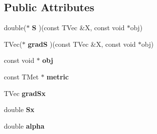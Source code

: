 \subsection*{Public Attributes}
\begin{DoxyCompactItemize}
\item 
\hypertarget{struct_d_r_d_s_p_1_1_line_search_aeeb734f0f9cfb12bb1012900d86b6ad3}{double($\ast$ {\bfseries S} )(const T\-Vec \&X, const void $\ast$obj)}\label{struct_d_r_d_s_p_1_1_line_search_aeeb734f0f9cfb12bb1012900d86b6ad3}

\item 
\hypertarget{struct_d_r_d_s_p_1_1_line_search_aa58cdd4d0ac6bb29c91013bf3e036511}{T\-Vec($\ast$ {\bfseries grad\-S} )(const T\-Vec \&X, const void $\ast$obj)}\label{struct_d_r_d_s_p_1_1_line_search_aa58cdd4d0ac6bb29c91013bf3e036511}

\item 
\hypertarget{struct_d_r_d_s_p_1_1_line_search_a5b4fc5bf7eec402586369be822ac471d}{const void $\ast$ {\bfseries obj}}\label{struct_d_r_d_s_p_1_1_line_search_a5b4fc5bf7eec402586369be822ac471d}

\item 
\hypertarget{struct_d_r_d_s_p_1_1_line_search_a97269c9395582cd1e5686b2bb88357b7}{const T\-Met $\ast$ {\bfseries metric}}\label{struct_d_r_d_s_p_1_1_line_search_a97269c9395582cd1e5686b2bb88357b7}

\item 
\hypertarget{struct_d_r_d_s_p_1_1_line_search_a69072580c2272d7dc555b89a727e575d}{T\-Vec {\bfseries grad\-Sx}}\label{struct_d_r_d_s_p_1_1_line_search_a69072580c2272d7dc555b89a727e575d}

\item 
\hypertarget{struct_d_r_d_s_p_1_1_line_search_a86391914be1b243831bd5227cca39513}{double {\bfseries Sx}}\label{struct_d_r_d_s_p_1_1_line_search_a86391914be1b243831bd5227cca39513}

\item 
\hypertarget{struct_d_r_d_s_p_1_1_line_search_aae7c2b8bcd865b0a6aba7754ace51073}{double {\bfseries alpha}}\label{struct_d_r_d_s_p_1_1_line_search_aae7c2b8bcd865b0a6aba7754ace51073}

\end{DoxyCompactItemize}
